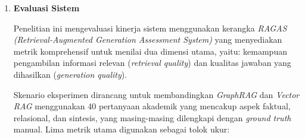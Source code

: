 \begin{enumerate}[label=\textbf{\arabic*.}, leftmargin=*, itemsep=10pt]
\begin{enumerate}[label=\textbf{\alph*.}, leftmargin=*, itemsep=5pt]
\begin{enumerate}[label=\textbf{\arabic*.}, leftmargin=*, itemsep=6pt]
                        \item \textbf{\textit{Data Truncation}:} Data dipangkas hingga total token memenuhi ambang batas komputasi.

                    \end{enumerate}

                    \noindent
                    Mekanisme ini menghasilkan konteks global yang kaya akan informasi hubungan, yang diformulasikan dalam persamaan:
                    \begin{equation}
                        \mathcal{L}_{\text{global}} = (\mathcal{E}_{\text{global}}, \mathcal{R}_{\text{global}}, \mathcal{T}_{\text{global}})
                        = \text{pipeline}_{\text{global}}(\mathcal{K}_h, G).
                    \end{equation}
                    \noindent
                    Sinergi antara presisi tinggi \textit{Local Retrieval} dan cakupan luas \textit{Global Retrieval} menjadi keunggulan utama arsitektur \textit{GraphRAG} dalam menangani kompleksitas literatur ilmiah.

              \item \textbf{\textit{LLM Generation} \& \textit{Response}}
                    \hspace*{0.75cm}Tahap ini merupakan fase akhir, di mana informasi yang telah diekstraksi dari \textit{local} dan \textit{global} disintesis. Konteks yang terintegrasi ini kemudian disatukan dengan kueri asli pengguna untuk membentuk sebuah \textit{augmented prompt}. \textit{Augmented prompt} ini kemudian dikirimkan ke \textit{LLM} untuk menghasilkan jawaban akhir.
          \end{enumerate}

    \item \textbf{Evaluasi Sistem}
          \label{subsec:system-evaluation}

          \hspace*{0.75cm}Penelitian ini mengevaluasi kinerja sistem menggunakan kerangka \textit{RAGAS (Retrieval-Augmented Generation Assessment System)} yang menyediakan metrik komprehensif untuk menilai dua dimensi utama, yaitu: kemampuan pengambilan informasi relevan (\textit{retrieval quality}) dan kualitas jawaban yang dihasilkan (\textit{generation quality}).

          \hspace*{0.75cm}Skenario eksperimen dirancang untuk membandingkan \textit{GraphRAG} dan \textit{Vector RAG} menggunakan 40 pertanyaan akademik yang mencakup aspek faktual, relasional, dan sintesis, yang masing-masing dilengkapi dengan \textit{ground truth} manual. Lima metrik utama digunakan sebagai tolok ukur:


\end{enumerate}
